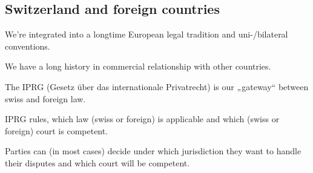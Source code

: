 \subsection{Switzerland and foreign countries}
\begin{compactitem}
	\item We're integrated into a longtime European legal tradition and uni-/bilateral conventions.
	\item We have a long history in commercial relationship with other countries.
	\item The IPRG (Gesetz über das internationale Privatrecht) is our „gateway“ between swiss and foreign law.
	\item IPRG rules, which law (swiss or foreign) is applicable and which (swiss or foreign) court is competent.
	\item Parties can (in most cases) decide under which jurisdiction they want to handle their disputes and which court will be competent.
\end{compactitem}